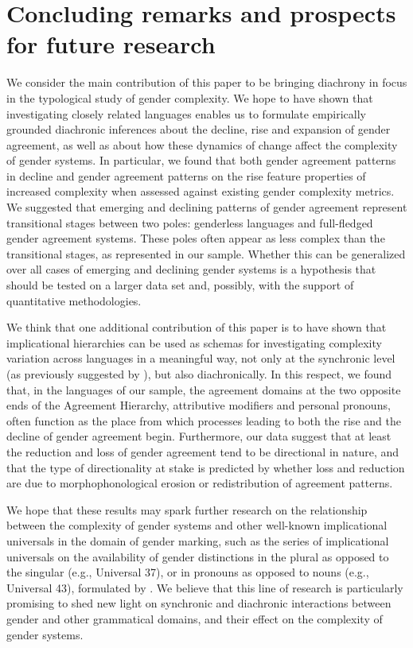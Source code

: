 \documentclass[output=collectionpaper]{langsci/langscibook}
\begin{document}
\section{Concluding remarks and prospects for future research}
\label{sec:dgm:conclusion}
We consider the main contribution of this paper to be bringing diachrony in focus in the typological study of gender complexity.
We hope to have shown that investigating closely related languages enables us to formulate empirically grounded diachronic inferences about the decline, rise and expansion of gender agreement, as well as about how these dynamics of change affect the complexity of gender systems. In particular, we found that both gender agreement patterns in decline and gender agreement patterns on the rise feature properties of increased complexity when assessed against existing gender complexity metrics. We suggested that emerging and declining patterns of gender agreement represent transitional stages between two poles: genderless languages and full-fledged gender agreement systems. These poles often appear as less complex than the transitional stages, as represented in our sample. Whether this can be generalized over all cases of emerging and declining gender systems is a hypothesis that should be tested on a larger data set and, possibly, with the support of quantitative methodologies.

We think that one additional contribution of this paper is to have shown that implicational hierarchies can be used as schemas for investigating complexity variation across languages in a meaningful way, not only at the synchronic level (as previously suggested by \citealt{Miestamo2009}), but also diachronically. In this respect, we found that, in the languages of our sample, the agreement domains at the two opposite ends of the Agreement Hierarchy, attributive modifiers and personal pronouns, often function as the place from which processes leading to both the rise and the decline of gender agreement begin. Furthermore, our data suggest that at least the reduction and loss of gender agreement tend to be directional in nature, and that the type of directionality at stake is predicted by whether loss and reduction are due to morphophonological erosion or redistribution of agreement patterns.

We hope that these results may spark further research on the relationship between the complexity of gender systems and other well-known implicational universals in the domain of gender marking, such as the series of implicational universals on the availability of gender distinctions in the plural as opposed to the singular (e.g., Universal 37), or in pronouns as opposed to nouns (e.g., Universal 43), formulated by \citet{Greenberg1963}. We believe that this line of research is particularly promising to shed new light on synchronic and diachronic interactions between gender and other grammatical domains, and their effect on the complexity of gender systems.
\end{document}
